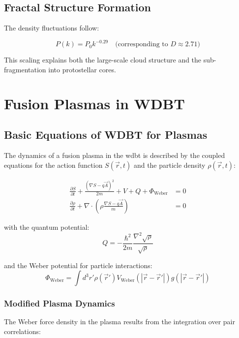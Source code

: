 \section{Fractal Structure Formation}
The density fluctuations follow:

\begin{equation}
P(k) = P_0 k^{-0.29} \quad \text{(corresponding to } D \approx 2.71\text{)}
\end{equation}

This scaling explains both the large-scale cloud structure and the sub-fragmentation into protostellar cores.

\chapter{Fusion Plasmas in WDBT}
\section{Basic Equations of WDBT for Plasmas}

The dynamics of a fusion plasma in the \gls{wdbt} is described by the coupled equations for the action function $S(\vec{r},t)$ and the particle density $\rho(\vec{r},t)$:

\begin{align}
\frac{\partial S}{\partial t} + \frac{(\nabla S - q\vec{A})^2}{2m} + V + Q + \Phi_{\text{Weber}} &= 0 \label{eq:B1} \\
\frac{\partial \rho}{\partial t} + \nabla \cdot \left(\rho \frac{\nabla S - q\vec{A}}{m}\right) &= 0 \label{eq:B2}
\end{align}

with the quantum potential:
\begin{equation}
Q = -\frac{\hbar^2}{2m} \frac{\nabla^2 \sqrt{\rho}}{\sqrt{\rho}} \label{eq:Q}
\end{equation}

and the Weber potential for particle interactions:
\begin{equation}
\Phi_{\text{Weber}} = \int d^3r' \rho(\vec{r}') V_{\text{Weber}}(|\vec{r}-\vec{r}'|) g(|\vec{r}-\vec{r}'|)
\end{equation}

\subsection{Modified Plasma Dynamics}

The Weber force density in the plasma results from the integration over pair correlations:

